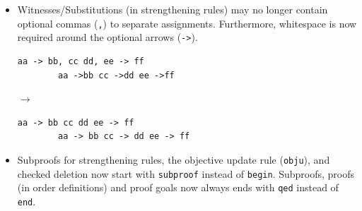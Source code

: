 \documentclass[a4paper]{article}
\newcommand{\veriPB}[0]{\textsc{VeriPB}}
\begin{document}
\begin{itemize}
	      \begin{minipage}[t]{.05\linewidth}
		      \centering \vspace*{-5mm}$\to$
	      \end{minipage}\hfill%
	      \hfill%
	      \begin{minipage}{.47\linewidth}
		      \begin{lstlisting}[language=veripb, gobble=8, rulecolor=\color{veripb-valid-text}, caption={\veriPB{} 3.0 syntax.}]
		red +1 ~r1 +1 x1 >= 1 : r1 -> 0;
		e +1 ~r1 +1 x1 >= 1 : -1;
		\end{lstlisting}
	      \end{minipage}
	\item Witnesses/Substitutions (in strengthening rules) may no longer contain optional commas (\verb!,!) to separate assignments. Furthermore, whitespace is now required around the optional arrows (\verb!->!).
	      \\[1mm]
	      \begin{minipage}{.47\linewidth}
		      \begin{lstlisting}[language=veripb, gobble=8, rulecolor=\color{veripb-invalid-text}, caption={\veriPB{} 2.0 syntax.}]
		aa -> bb, cc dd, ee -> ff
		aa ->bb cc ->dd ee ->ff
		\end{lstlisting}
	      \end{minipage}\hfill%
	      \begin{minipage}[t]{.05\linewidth}
		      \centering \vspace*{-5mm}$\to$
	      \end{minipage}\hfill%
	      \hfill%
	      \begin{minipage}{.47\linewidth}
		      \begin{lstlisting}[language=veripb, gobble=8, rulecolor=\color{veripb-valid-text}, caption={\veriPB{} 3.0 syntax.}]
		aa -> bb cc dd ee -> ff
		aa -> bb cc -> dd ee -> ff
		\end{lstlisting}
	      \end{minipage}
	\item Subproofs for strengthening rules, the objective update rule (\lstinline[language=veripb]!obju!), and checked deletion now start with \verb!subproof! instead of \verb!begin!. Subproofs, proofs (in order definitions) and proof goals now always ends with \verb!qed! instead of \verb!end!.
	      \\[1mm]
	      \begin{minipage}{.47\linewidth}
		      \begin{lstlisting}[language=veripb, gobble=8, rulecolor=\color{veripb-invalid-text}, caption={\veriPB{} 2.0 syntax.}]

\end{lstlisting}
\end{minipage}
\end{itemize}
\end{document}
